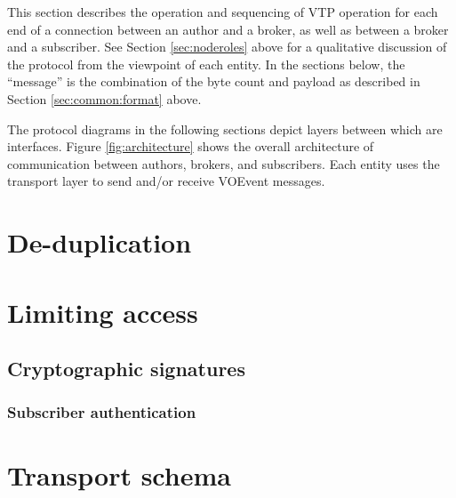 \documentclass[a4paper,11pt]{ivoa}
\begin{document}
This section describes the operation and sequencing of VTP operation for each
end of a connection between an author and a broker, as well as between a
broker and a subscriber. See Section \ref{sec:noderoles} above for a
qualitative discussion of the protocol from the viewpoint of each entity. In
the sections below, the ``message'' is the combination of the byte count and
payload as described in Section \ref{sec:common:format} above.

The protocol diagrams in the following sections depict layers between which
are interfaces. Figure \ref{fig:architecture} shows the overall architecture
of communication between authors, brokers, and subscribers. Each entity uses
the transport layer to send and/or receive VOEvent messages.

\section{De-duplication}
\label{sec:dedup}

\section{Limiting access}
\label{sec:limit}

\subsection{Cryptographic signatures}

\subsubsection{Subscriber authentication}
\label{sec:limit:crypto:subscriber}

\appendix

\section{Transport schema}
\label{sec:transportschema}



\end{document}
